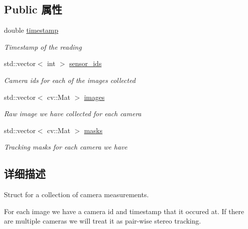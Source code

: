 \subsection*{Public 属性}
\begin{DoxyCompactItemize}
\item 
\mbox{\label{structov__core_1_1CameraData_a45a72238c04abfdba1157d5cb0d797ad}} 
double \hyperlink{structov__core_1_1CameraData_a45a72238c04abfdba1157d5cb0d797ad}{timestamp}
\begin{DoxyCompactList}\small\item\em Timestamp of the reading \end{DoxyCompactList}\item 
\mbox{\label{structov__core_1_1CameraData_a3ca97cd845766a368f65d771563908a5}} 
std\+::vector$<$ int $>$ \hyperlink{structov__core_1_1CameraData_a3ca97cd845766a368f65d771563908a5}{sensor\+\_\+ids}
\begin{DoxyCompactList}\small\item\em Camera ids for each of the images collected \end{DoxyCompactList}\item 
\mbox{\label{structov__core_1_1CameraData_aeb70773b73cb3908b60f4619c28bbbdb}} 
std\+::vector$<$ cv\+::\+Mat $>$ \hyperlink{structov__core_1_1CameraData_aeb70773b73cb3908b60f4619c28bbbdb}{images}
\begin{DoxyCompactList}\small\item\em Raw image we have collected for each camera \end{DoxyCompactList}\item 
\mbox{\label{structov__core_1_1CameraData_aa6b398defbcc6f8eebf1881bc71bf852}} 
std\+::vector$<$ cv\+::\+Mat $>$ \hyperlink{structov__core_1_1CameraData_aa6b398defbcc6f8eebf1881bc71bf852}{masks}
\begin{DoxyCompactList}\small\item\em Tracking masks for each camera we have \end{DoxyCompactList}\end{DoxyCompactItemize}


\subsection{详细描述}
Struct for a collection of camera measurements. 

For each image we have a camera id and timestamp that it occured at. If there are multiple cameras we will treat it as pair-\/wise stereo tracking. 